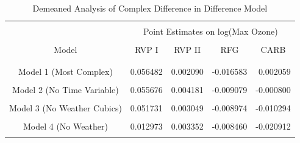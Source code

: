 \documentclass{article}
\begin{document}
\begin{table}[h]
\centering
\begin{tabular}{lllll}
\hline
                                                &                           &                              &                         &                               \\
\multicolumn{1}{c}{}                            & \multicolumn{4}{c}{Point Estimates on log(Max Ozone)}                                                                                \\ \cline{2-5} 
                                                &                           &                              &                         &                               \\
\multicolumn{1}{c}{Model}            & \multicolumn{1}{c}{RVP I} & \multicolumn{1}{c}{RVP II}   & \multicolumn{1}{c}{RFG} & \multicolumn{1}{c}{CARB}      \\
                                                &                           &                              &                         &                               \\ \hline
                                                &                           &                              &                         &                               \\
\multicolumn{1}{c}{Model 1 (Most Complex)}      & 0.056482                  & \multicolumn{1}{r}{0.002090} & -0.016583               & \multicolumn{1}{r}{0.002059}  \\
                                                &                           &                              &                         &                               \\
\multicolumn{1}{c}{Model 2 (No Time Variable)}  & 0.055676                  & \multicolumn{1}{r}{0.004181} & -0.009079               & \multicolumn{1}{r}{-0.000800} \\
                                                &                           &                              &                         &                               \\
\multicolumn{1}{c}{Model 3 (No Weather Cubics)} & 0.051731                  & \multicolumn{1}{r}{0.003049} & -0.008974               & \multicolumn{1}{r}{-0.010294} \\
                                                &                           &                              &                         &                               \\
\multicolumn{1}{c}{Model 4 (No Weather)}        & 0.012973                  & \multicolumn{1}{r}{0.003352} & -0.008460               & \multicolumn{1}{r}{-0.020912} \\
                                                &                           &                              &                         &                               \\ \hline
\end{tabular}
\caption{Demeaned Analysis of Complex Difference in Difference Model}
\label{tab:robust_table2}
\end{table}
\end{document}
